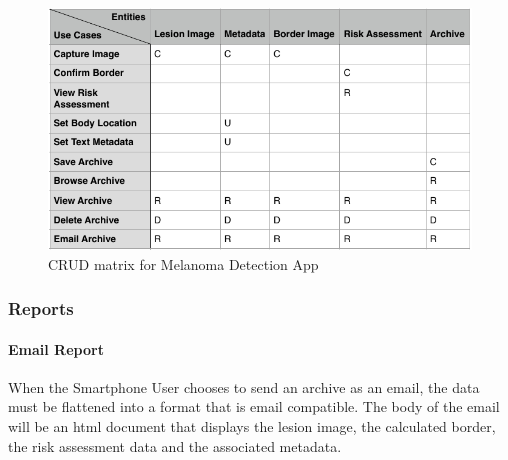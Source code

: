                 \begin{figure}[H]
                    \centering
                    \includegraphics[width=\textwidth]{assets/requirements/CRUD.pdf}
                    \caption{CRUD matrix for Melanoma Detection App}
                    \label{fig:crud}
                \end{figure}

        \subsubsection{Reports}
            \paragraph{Email Report}
                When the Smartphone User chooses to send an archive as an email, the data must be flattened into a format that is email compatible. The body of the email will be an html document that displays the lesion image, the calculated border, the risk assessment data and the associated metadata.


